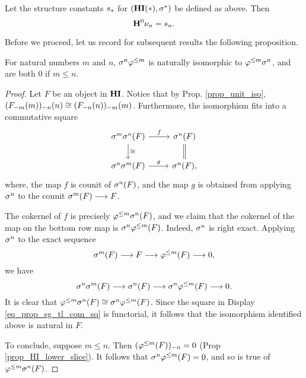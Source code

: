 \begin{cor}\label{cor_H_commute_with_slice}
Let the structure constants $\slice{*}$ for $(\LHI[*]{\HI}, 
\sgHI{*})$ be defined as above. Then
\[
\HH^0 \sliceDM{n} = \slice{n}.
\]
\end{cor}

Before we proceed, let us record for subsequent results the 
following proposition.

\begin{prop}\label{prop_sg_tl_commute}
For natural numbers $m$ and $n$, $\sgHI{n} \tlHI{m}$ is naturally
isomorphic to $\tlHI{m} \sgHI{n}$, and are both 0 if $m \leq n$.
\end{prop}
\begin{proof}
Let $F$ be an object in $\HI$. Notice that by Prop. 
\ref{prop_unit_iso}, $\LHI[n]{\RHI[n]{(\LHI[m]{\RHI[m]{F}})}} 
\cong \LHI[m]{\RHI[m]{(\LHI[n]{\RHI[n]{F}})}}$. Furthermore, the 
isomorphism fits into a commutative square
\begin{equation}\label{eq_prop_sg_tl_com_sq}
\begin{tikzcd}
\sgHI{m}\sgHI{n}(F) \arrow{r}{f} \arrow{d}{\cong} & 
\sgHI{n}(F) \arrow[equal]{d} \\
\sgHI{n}\sgHI{m}(F) \arrow{r}{g} &
\sgHI{n}(F),
\end{tikzcd}
\end{equation}
where, the map $f$ is counit of $\sgHI{n}(F)$, and the map $g$
is obtained from applying $\sgHI{n}$ to the counit $\sgHI{m}(F) 
\to F$.

The cokernel of $f$ is precisely $\tlHI{m} \sgHI{n}(F)$, and we 
claim that the cokernel of the map on the bottom row map is 
$\sgHI{n} \tlHI{m}(F)$. Indeed, $\sgHI{n}$ is right exact. Applying 
$\sgHI{n}$ to the exact sequence
\[
\sgHI{m}(F) \to F \to \tlHI{m}(F) \to 0,
\]
we have
\[
\sgHI{n} \sgHI{m}(F) \to \sgHI{n}(F) \to \sgHI{n} \tlHI{m}(F) \to 0.
\]
It is clear that $\tlHI{m} \sgHI{n}(F) \cong \sgHI{n} \tlHI{m}(F)$.
Since the square in Display \ref{eq_prop_sg_tl_com_sq} is 
functorial, it follows that the isomorphism identified above is
natural in $F$.

To conclude, suppose $m \leq n$. Then $\RHI[n]{(\tlHI{m}(F))} = 0$
(Prop \ref{prop_HI_lower_slice}). It follows that $\sgHI{n} 
\tlHI{m}(F) = 0$, and so is true of $\tlHI{m} \sgHI{n}(F)$.
\end{proof}

